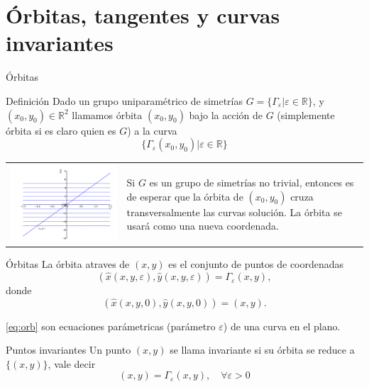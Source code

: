 \documentclass{article}
\newcommand{\rr}{\mathbb{R}}
\renewcommand{\emph}[1]{\textcolor[rgb]{1,0,0}{#1}}
\renewcommand{\epsilon}{\varepsilon}
\begin{document}
\section[Órbitas]{Órbitas, tangentes y curvas invariantes}
{Órbitas}

{Definición}
Dado un grupo uniparamétrico de simetrías $G=\{\Gamma_{\epsilon}|\epsilon\in\rr\}$, y $(x_0,y_0)\in\rr^2$ llamamos \emph{órbita $(x_0,y_0)$ bajo la acción de  $G$} (simplemente órbita si es claro quien es $G$) a la curva
\[\{\Gamma_{\epsilon}(x_0,y_0)|\epsilon\in\rr\} \]



\begin{tabular}{m{5cm} m{4cm}}
\includegraphics[scale=.3]{imagenes/sol_trivialB.png} &
Si $G$ es un grupo de simetrías no trivial, entonces es de esperar que la órbita de  $(x_0,y_0)$ cruza transversalmente las curvas solución. La órbita se usará como una nueva coordenada.   
\end{tabular}

{Órbitas}
 La órbita atraves de $(x,y)$ es el conjunto de puntos de coordenadas
\begin{equation}\label{eq:orb} (\hat{x}(x,y,\epsilon),\hat{y}(x,y,\epsilon))=\Gamma_{\epsilon}(x,y),
\end{equation}
donde
\[(\hat{x}(x,y,0),\hat{y}(x,y,0))=(x,y).\]

\eqref{eq:orb} son ecuaciones parámetricas (parámetro $\epsilon$) de una  curva en el plano.

 {Puntos invariantes}
Un punto $(x,y)$ se llama invariante si su órbita se reduce a $\{(x,y)\}$, vale decir
\[(x,y)=\Gamma_{\epsilon}(x,y),\quad\forall \epsilon>0\]
\end{document}
